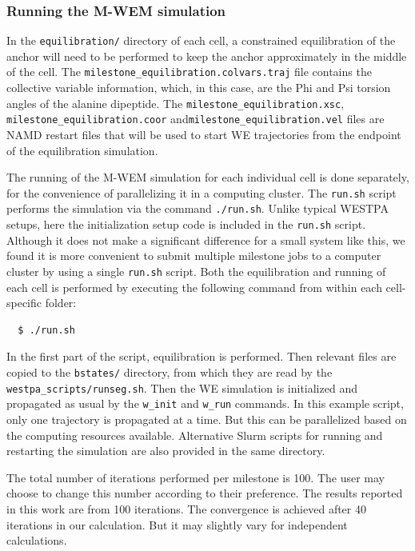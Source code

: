 \subsubsection{Running the M-WEM simulation} In the \verb|equilibration/| directory of each cell, a constrained equilibration of the anchor will need to be performed to keep the anchor approximately in the middle of the cell. 
The \verb|milestone_equilibration.colvars.traj| file contains the collective variable information, which, in this case, are the Phi and Psi torsion angles of the alanine dipeptide. 
The \verb|milestone_equilibration.xsc|, \verb|milestone_equilibration.coor| and\linebreak \verb|milestone_equilibration.vel| files are NAMD restart files that will be used to start WE trajectories from the endpoint of the equilibration simulation. 

The running of the M-WEM simulation for each individual cell is done separately, for the convenience of parallelizing it in a computing cluster. 
The \verb|run.sh| script performs the simulation via the command \verb|./run.sh|.
Unlike typical WESTPA setups, here the initialization setup code is included in the \verb|run.sh| script. 
Although it does not make a significant difference for a small system like this, we found it is more convenient to submit multiple milestone jobs to a computer cluster by using a single \verb|run.sh| script. 
Both the equilibration and running of each cell is performed by executing the following command from within each cell-specific folder:

\begin{verbatim}
  $ ./run.sh
\end{verbatim}

In the first part of the script, equilibration is performed. 
Then relevant files are copied to the \verb|bstates/| directory, from which they are read by the \verb|westpa_scripts/runseg.sh|. 
Then the WE simulation is initialized and propagated as usual by the \verb|w_init| and \verb|w_run| commands. 
In this example script, only one trajectory is propagated at a time. 
But this can be parallelized based on the computing resources available.
Alternative Slurm scripts for running and restarting the simulation are also provided in the same directory.

The total number of iterations performed per milestone is 100. 
The user may choose to change this number according to their preference. 
The results reported in this work are from 100 iterations. 
The convergence is achieved after 40 iterations in our calculation. 
But it may slightly vary for independent calculations.

